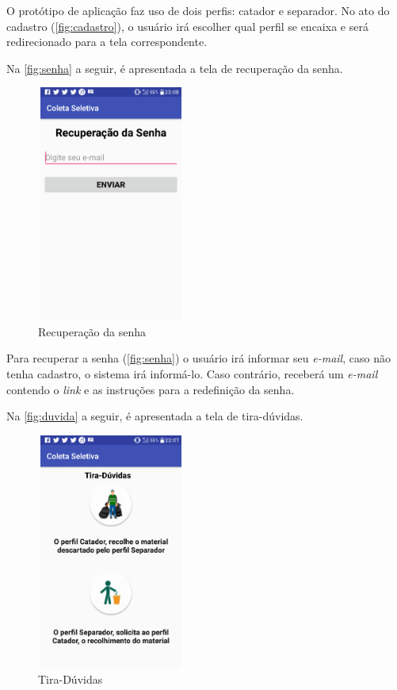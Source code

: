 O protótipo de aplicação faz uso de dois perfis: catador e separador. No ato do cadastro (\autoref{fig:cadastro}), o usuário irá escolher qual perfil se encaixa e será redirecionado para a tela correspondente. 

Na \autoref{fig:senha} a seguir, é apresentada a tela de recuperação da senha.

\begin{figure}[H]
	\begin{Center}
		\includegraphics[width=1.92in,height=3.06in]{./media/image42.png}
	\end{Center}
	\caption{Recuperação da senha}
	\label{fig:senha}
\end{figure}

Para recuperar a senha (\autoref{fig:senha}) o usuário irá informar seu \textit{e-mail}, caso não tenha cadastro, o sistema irá informá-lo. Caso contrário, receberá um \textit{e-mail} contendo o \textit{link} e as instruções para a redefinição da senha.

Na \autoref{fig:duvida} a seguir, é apresentada a tela de tira-dúvidas.

\begin{figure}[H]
	\begin{Center}
		\includegraphics[width=1.92in,height=3.06in]{./media/image48.png}
	\end{Center}
	\caption{Tira-Dúvidas}
	\label{fig:duvida}
\end{figure}


